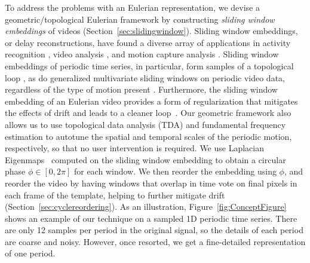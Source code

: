 \documentclass{article}
\begin{document}
To address the problems with an Eulerian representation, we devise a geometric/topological Eulerian framework by constructing {\em sliding window embeddings} of videos (Section~\ref{sec:slidingwindow}).  Sliding window embeddings, or delay reconstructions, have found a diverse array of applications in activity recognition \cite{frank2010activity,venkataraman2016shape}, video analysis \cite{tralie2017quasi}, and motion capture analysis \cite{venkataraman2016shape}.  Sliding window embeddings of periodic time series, in particular, form samples of a topological loop \cite{perea2015sliding}, as do generalized multivariate sliding windows on periodic video data, regardless of the type of motion present \cite{traliehigh, tralie2017quasi}.  Furthermore, the sliding window embedding of an Eulerian video provides a form of regularization that mitigates the effects of drift and leads to a cleaner loop~\cite{tralie2017quasi}.  Our geometric framework also allows us to use topological data analysis (TDA) \cite{edelsbrunner2000topological,edelsbrunner2008persistent,edelsbrunner2010computational,carlsson2009topology,ghrist2014elementary} and fundamental frequency estimation \cite{Mcleod05asmarter} to autotune the spatial and temporal scales of the periodic motion, respectively, so that no user intervention is required.  We use Laplacian Eigenmaps~\cite{belkin2003laplacian} computed on the sliding window embedding to obtain a circular phase $\phi \in [0, 2\pi]$ for each window.  We then reorder the embedding using $\phi$, and reorder the video by having windows that overlap in time vote on final pixels in each frame of the template, helping to further mitigate drift (Section~\ref{sec:cyclereordering}).  As an illustration, Figure~\ref{fig:ConceptFigure} shows an example of our technique on a sampled 1D periodic time series.  There are only 12 samples per period in the original signal, so the details of each period are coarse and noisy.  However, once resorted, we get a fine-detailed representation of one period.
\end{document}
